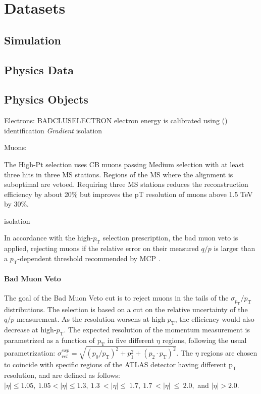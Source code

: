 \chapter{Datasets}

\section{Simulation}
\section{Physics Data}
\section{Physics Objects}\label{sec:physObjects}

Electrons:
BADCLUSELECTRON
electron energy is calibrated using  ()
 identification
\emph{Gradient} isolation

Muons:

The High-Pt selection uses CB muons passing Medium selection with at least three hits in three MS stations. Regions of the MS where the alignment is suboptimal are vetoed. Requiring three MS stations reduces the reconstruction efficiency by about 20\% but improves the pT resolution of muons above 1.5 TeV by 30\%.




 isolation

In accordance with the high-$p_\mathrm{T}$ selection prescription, the bad muon veto is applied, rejecting muons if the relative error on their measured $q/p$ is larger than a $p_\mathrm{T}$-dependent threshold recommended by MCP \cite{MCP_recommendations}.

\subsubsection{Bad Muon Veto}
\label{sec:bmv}
The goal of the Bad Muon Veto cut is to reject muons in the tails of the $\sigma_{p_\mathrm{T}}/p_\mathrm{T}$ distributions. The selection is based on a cut on the relative uncertainty of the $q/p$ measurement. As the resolution worsens at high-$p_\mathrm{T}$, the efficiency would also decrease at high-$p_\mathrm{T}$.
The expected resolution of the momentum measurement is parametrized as a function of $\mathrm{p_T}$ in five different $\eta$ regions, following the usual parametrization: $\sigma_{rel}^{exp} = \sqrt{(p_0/p_\mathrm{T})^{2} + p_1^2 + (p_2\cdot p_\mathrm{T})^{2}}$. The $\eta$ regions are chosen to coincide with specific regions of the ATLAS detector having different $\mathrm{p_T}$ resolution, and are defined as follows: $|\eta| \leq 1.05,\ 1.05 < |\eta| \leq 1.3,\ 1.3\ < |\eta| \leq\ 1.7,\ 1.7\ < |\eta|\ \leq\ 2.0,$ and $|\eta| > 2.0$.

